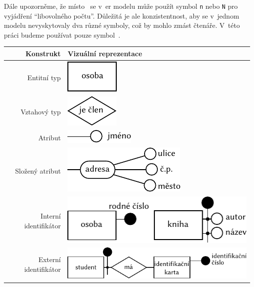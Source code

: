 Dále upozorněme, že místo~\many{} se v~\acrshort{er} modelu může použít symbol \texttt{n} nebo \texttt{N} pro vyjádření \enquote{libovolného počtu}.
Důležitá je ale konzistentnost, aby se v~jednom modelu nevyskytovaly dva různé symboly, což by mohlo zmást čtenáře.
V~této práci budeme používat pouze symbol~\many{}.

\begin{table}[!htb]
  \centering
  \begin{tabular}{@{}rm{9cm}@{}} \toprule
    Konstrukt             & Vizuální reprezentace                                     \\ \midrule
    Entitní typ           & {\centering\includegraphics{../img/er-model/entity.pdf}}  \\
    Vztahový typ          & \includegraphics{../img/er-model/relationship.pdf}        \\
    Atribut               & \includegraphics{../img/er-model/attribute.pdf}           \\
    Složený atribut       & \includegraphics{../img/er-model/composite-attribute.pdf} \\
    Interní identifikátor & \includegraphics{../img/er-model/identifier.pdf}          \\
    Externí identifikátor & \includegraphics{../img/er-model/external-identifier.pdf} \\

\end{tabular}
\end{table}
